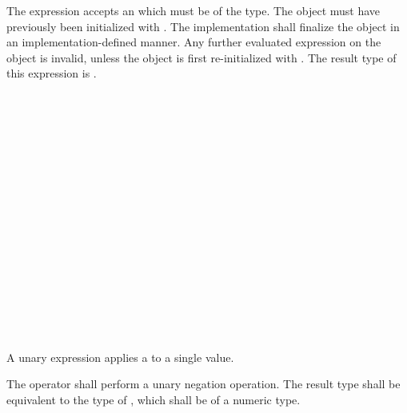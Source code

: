 \specsubsubitem
The  expression accepts an  which
must be of the  type. The object must have previously been
initialized with . The implementation shall finalize the
 object in an implementation-defined manner. Any further
evaluated  expression on the object is invalid, unless the
object is first re-initialized with . The result type of this
expression is .


\begin{grammar}
 \\
	 \\
	 \\
	 \\
	 \\
	 \\
	 \\
	 \\
\end{grammar}


\begin{grammar}
 \\
	 \\
	 \\
	 \\
	 \\
	  \\

 \oneof \\
	\terminal{-}
	\terminal{\textasciitilde}
	\terminal{!}
	\terminal{*}
	\terminal{\&}
\end{grammar}

\specsubsubitem
A unary expression applies a  to a single value.

\specsubsubitem
The \terminal{-} operator shall perform a unary negation operation. The result
type shall be equivalent to the type of , which
shall be of a numeric type.

